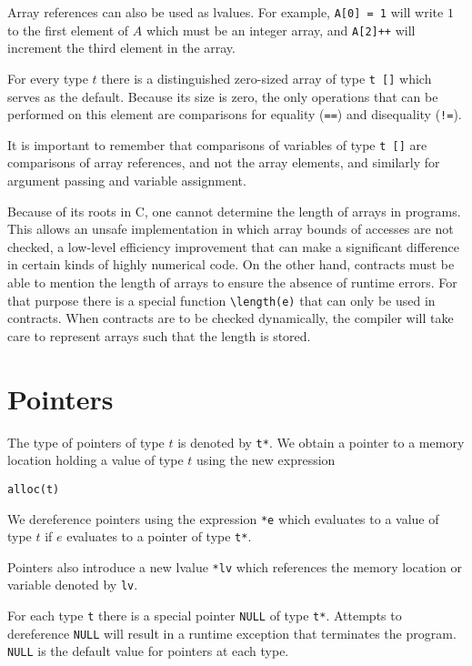 \documentclass[11pt]{article}
\begin{document}
Array references can also be used as lvalues.  For
example, \verb'A[0] = 1' will write $1$ to the first element
of $A$ which must be an integer array, and \verb'A[2]++' will
increment the third element in the array.

For every type $t$ there is a distinguished zero-sized array of type
\verb't []' which serves as the default.  Because its size is zero,
the only operations that can be performed on this element are
comparisons for equality (\verb'==') and disequality (\verb'!=').

It is important to remember that comparisons of variables of
type \verb't []' are comparisons of array references, and not
the array elements, and similarly for argument passing and variable
assignment.

Because of its roots in C, one cannot determine the length of arrays
in programs.  This allows an unsafe implementation in which array
bounds of accesses are not checked, a low-level efficiency improvement
that can make a significant difference in certain kinds of highly
numerical code.  On the other hand, contracts must be able to mention
the length of arrays to ensure the absence of runtime errors.  For
that purpose there is a special function \verb'\length(e)' that can
only be used in contracts.  When contracts are to be checked
dynamically, the compiler will take care to represent arrays such
that the length is stored.

\section{Pointers}

The type of pointers of type $t$ is denoted by \verb't*'.
We obtain a pointer to a memory location holding a
value of type $t$ using the new expression
\begin{verbatim}
alloc(t)
\end{verbatim}
We dereference pointers using the expression \verb'*e'
which evaluates to a value of type $t$ if
$e$ evaluates to a pointer of type \verb't*'.

Pointers also introduce a new lvalue \verb'*lv' which references the
memory location or variable denoted by \verb'lv'.

For each type \verb't' there is a special pointer \verb'NULL'
of type \verb't*'.  Attempts to dereference \verb'NULL' will result
in a runtime exception that terminates the program.  \verb'NULL'
is the default value for pointers at each type.
\end{document}

